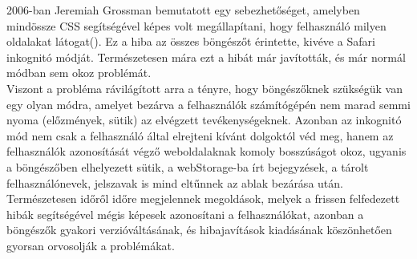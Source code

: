 2006-ban Jeremiah Grossman bemutatott egy sebezhetőséget, amelyben mindössze CSS segítségével képes volt megállapítani, hogy felhasználó milyen oldalakat látogat(\cite{css_history_hack}). Ez a hiba az összes böngészőt érintette, kivéve a Safari inkognitó módját. Természetesen mára ezt a hibát már javították, és már normál módban sem okoz problémát.\hfill\\
Viszont a probléma rávilágított arra a tényre, hogy böngészőknek szükségük van egy olyan módra, amelyet bezárva a felhasználók számítógépén nem marad semmi nyoma (előzmények, sütik) az elvégzett tevékenységeknek. Azonban az inkognitó mód nem csak a felhasználó által elrejteni kívánt dolgoktól véd meg, hanem az felhasználók azonosítását végző weboldalaknak komoly bosszúságot okoz, ugyanis a böngészőben elhelyezett sütik, a webStorage-ba írt bejegyzések, a tárolt felhasználónevek, jelszavak is mind eltűnnek az ablak bezárása után.\hfill\\
Természetesen időről időre megjelennek megoldások, melyek a frissen felfedezett hibák segítségével mégis képesek azonosítani a felhasználókat, azonban a böngészők gyakori verzióváltásának, és hibajavítások kiadásának köszönhetően gyorsan orvosolják a problémákat.
\label{ssub:miért}

\label{sub:inkognitó_mód}

